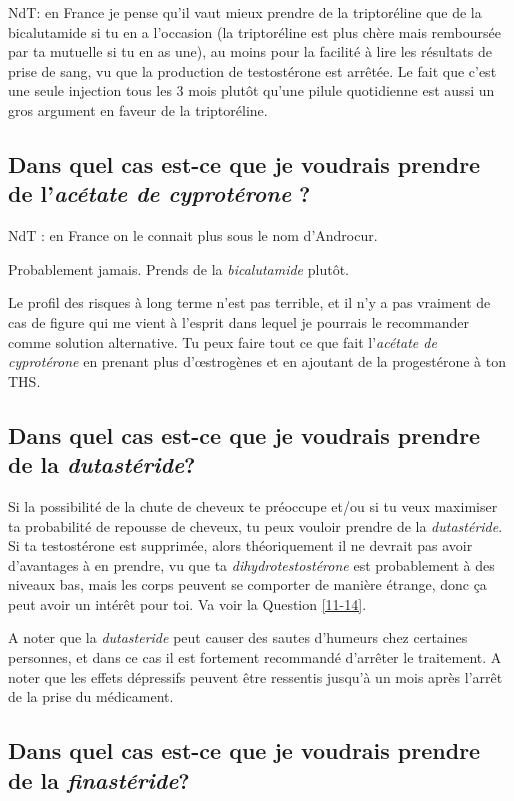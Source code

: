 \documentclass{article}
\begin{document}
NdT: en France je pense qu'il vaut mieux prendre de la triptoréline que de la bicalutamide si tu en a l'occasion (la triptoréline est plus chère mais remboursée par ta mutuelle si tu en as une), au moins pour la facilité à lire les résultats de prise de sang, vu que la production de testostérone est arrêtée. Le fait que c'est une seule injection tous les 3 mois plutôt qu'une pilule quotidienne est aussi un gros argument en faveur de la triptoréline.

\subsection{Dans quel cas est-ce que je voudrais prendre de l'\textit{acétate de cyprotérone} ?}

NdT : en France on le connait plus sous le nom d'Androcur.

Probablement jamais. Prends de la \textit{bicalutamide} plutôt.

Le profil des risques à long terme n'est pas terrible, et il n'y a pas vraiment de cas de figure qui me vient à l'esprit dans lequel je pourrais le recommander comme solution alternative. Tu peux faire tout ce que fait l'\textit{acétate de cyprotérone} en prenant plus d'œstrogènes et en ajoutant de la progestérone à ton THS.

\subsection{Dans quel cas est-ce que je voudrais prendre de la \textit{dutastéride}?}

Si la possibilité de la chute de cheveux te préoccupe et/ou si tu veux maximiser ta probabilité de repousse de cheveux, tu peux vouloir prendre de la \textit{dutastéride}. Si ta testostérone est supprimée, alors théoriquement il ne devrait pas avoir d'avantages à en prendre, vu que ta \textit{dihydrotestostérone} est probablement à des niveaux bas, mais les corps peuvent se comporter de manière étrange, donc ça peut avoir un intérêt pour toi. Va voir la Question \ref{11-14}.

A noter que la \textit{dutasteride} peut causer des sautes d'humeurs chez certaines personnes, et dans ce cas il est fortement recommandé d'arrêter le traitement. A noter que les effets dépressifs peuvent être ressentis jusqu'à un mois après l'arrêt de la prise du médicament.

\subsection{Dans quel cas est-ce que je voudrais prendre de la \textit{finastéride}?}
\end{document}
